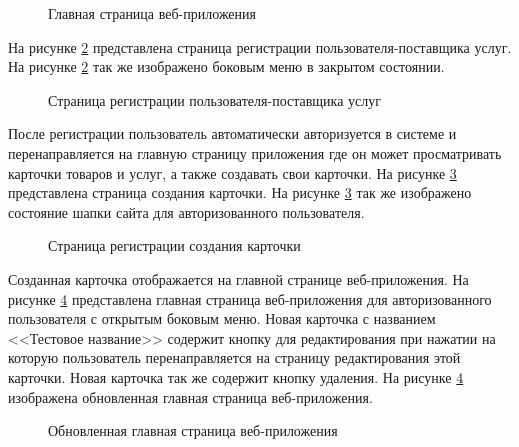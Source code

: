 \begin{figure}[H] %
\caption{Главная страница веб-приложения}
\label{test-front1:image}
\end{figure}

На рисунке \ref{test-front2:image} представлена страница регистрации пользователя-поставщика услуг. На рисунке \ref{test-front2:image} так же изображено боковым меню в закрытом состоянии.

\newpage %
\begin{figure}[H] %
\caption{Страница регистрации пользователя-поставщика услуг}
\label{test-front2:image}
\end{figure}

После регистрации пользователь автоматически авторизуется в системе и перенаправляется на главную страницу приложения где он может просматривать карточки товаров и услуг, а также создавать свои карточки. На рисунке \ref{test-front3:image} представлена страница создания карточки. На рисунке \ref{test-front3:image} так же изображено состояние шапки сайта для авторизованного пользователя.

\newpage %
\begin{figure}[H] %
\caption{Страница регистрации создания карточки}
\label{test-front3:image}
\end{figure}

Созданная карточка отображается на главной странице веб-приложения. На рисунке \ref{test-front4:image} представлена главная страница веб-приложения для авторизованного пользователя с открытым боковым меню. Новая карточка с названием <<Тестовое название>> содержит кнопку для редактирования при нажатии на которую пользователь перенаправляется на страницу редактирования этой карточки. Новая карточка так же содержит кнопку удаления. На рисунке \ref{test-front4:image} изображена обновленная главная страница веб-приложения.

\newpage %
\begin{figure}[H] %
\caption{Обновленная главная страница веб-приложения}
\label{test-front4:image}
\end{figure}

